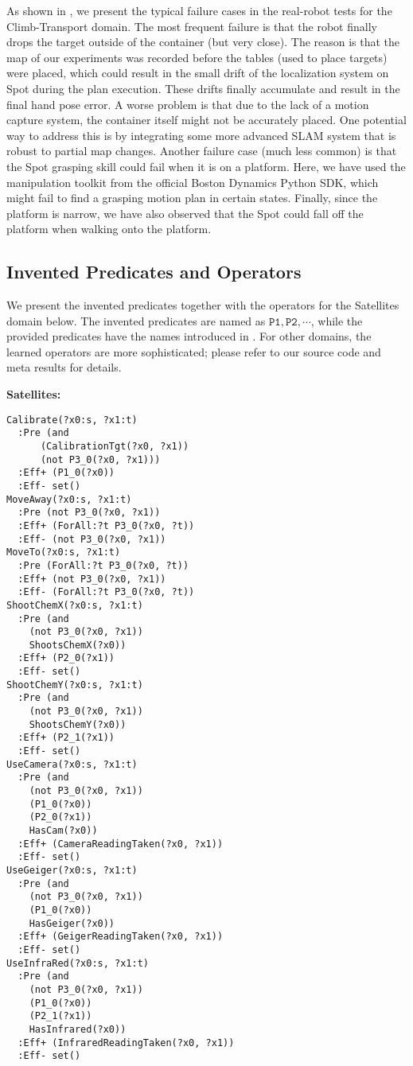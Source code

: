 As shown in , we present the typical failure cases in the real-robot tests for the Climb-Transport domain.
The most frequent failure is that the robot finally drops the target outside of the container (but very close).
The reason is that the map of our experiments was recorded before the tables (used to place targets) were placed, which could result in the small drift of the localization system on Spot during the plan execution.
These drifts finally accumulate and result in the final hand pose error.
A worse problem is that due to the lack of a motion capture system, the container itself might not be accurately placed.
One potential way to address this is by integrating some more advanced SLAM system that is robust to partial map changes.
Another failure case (much less common) is that the Spot grasping skill could fail when it is on a platform.
Here, we have used the manipulation toolkit from the official Boston Dynamics Python SDK, which might fail to find a grasping motion plan in certain states.
Finally, since the platform is narrow, we have also observed that the Spot could fall off the platform when walking onto the platform.


\subsection{Invented Predicates and Operators}\label{app:complete_op}
We present the invented predicates together with the operators for the Satellites domain below.
The invented predicates are named as $\mathtt{P1},\mathtt{P2},\cdots$, while the provided predicates have the names introduced in .
For other domains, the learned operators are more sophisticated; please refer to our source code and meta results for details.

\textbf{Satellites:}
\begin{Verbatim}[frame=single,resetmargins=true]
Calibrate(?x0:s, ?x1:t)
  :Pre (and 
      (CalibrationTgt(?x0, ?x1))
      (not P3_0(?x0, ?x1))) 
  :Eff+ (P1_0(?x0))
  :Eff- set()
MoveAway(?x0:s, ?x1:t)
  :Pre (not P3_0(?x0, ?x1))
  :Eff+ (ForAll:?t P3_0(?x0, ?t))
  :Eff- (not P3_0(?x0, ?x1))
MoveTo(?x0:s, ?x1:t)
  :Pre (ForAll:?t P3_0(?x0, ?t))
  :Eff+ (not P3_0(?x0, ?x1))
  :Eff- (ForAll:?t P3_0(?x0, ?t))
ShootChemX(?x0:s, ?x1:t)
  :Pre (and
    (not P3_0(?x0, ?x1))
    ShootsChemX(?x0))
  :Eff+ (P2_0(?x1))
  :Eff- set()
ShootChemY(?x0:s, ?x1:t)
  :Pre (and
    (not P3_0(?x0, ?x1))
    ShootsChemY(?x0))
  :Eff+ (P2_1(?x1))
  :Eff- set()
UseCamera(?x0:s, ?x1:t)
  :Pre (and
    (not P3_0(?x0, ?x1))
    (P1_0(?x0))
    (P2_0(?x1))
    HasCam(?x0))
  :Eff+ (CameraReadingTaken(?x0, ?x1))
  :Eff- set()
UseGeiger(?x0:s, ?x1:t)
  :Pre (and
    (not P3_0(?x0, ?x1))
    (P1_0(?x0))
    HasGeiger(?x0))
  :Eff+ (GeigerReadingTaken(?x0, ?x1))
  :Eff- set()
UseInfraRed(?x0:s, ?x1:t)
  :Pre (and
    (not P3_0(?x0, ?x1))
    (P1_0(?x0))
    (P2_1(?x1))
    HasInfrared(?x0))
  :Eff+ (InfraredReadingTaken(?x0, ?x1))
  :Eff- set()\end{Verbatim}


